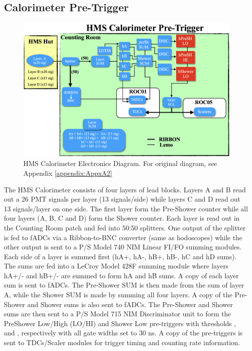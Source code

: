 \documentclass[11pt]{article}
\begin{document}
\subsection{Calorimeter Pre-Trigger}
\begin{figure}[h!]
  \centering
  \includegraphics[scale=0.35]{./hCAL_diagram.png}
  \caption{HMS Calorimeter Electronics Diagram. For original diagram, see Appendix \ref{appendix:AppxA2}}
  \label{fig:hCAL_diagram}
\end{figure}
\noindent The HMS Calorimeter consists of four layers of lead blocks. Layers A and B read out a 26 PMT signals per layer (13 signals/side) while layers C and D
read out 13 signals/layer on one side. The first layer form the Pre-Shower counter while all four layers (A, B, C and D) form the Shower counter.  
Each layer is read out in the Counting Room patch and fed into 50:50 splitters. One output of the splitter is fed to fADCs via a Ribbon-to-BNC converter (same as hodoscopes)
while the other output is sent to a P/S Model 740 NIM Linear FI/FO summing modules. Each side of a layer is summed first (hA+, hA-, hB+, hB-, hC and hD sums). The sums are fed into
a LeCroy Model 428F summing module where layers hA+/- and hB+/- are summed to form hA and hB sums. A copy of each layer sum is sent to fADCs. The Pre-Shower SUM is then made from the sum of layer A, while the Shower SUM is made by summing all four layers. A copy of the Pre-Shower and Shower sums is also sent to fADCs. The Pre-Shower and Shower sums are then sent to a P/S Model 715
NIM Discriminator unit to form the PreShower Low/High (LO/HI) and Shower Low pre-triggers with thresholds \hPrShLo, \hPrShHi and \hSHLo, respectively with all gate widths set to 30 ns. A copy of the pre-triggers is sent to TDCs/Scaler modules for trigger timing and counting rate
information.
\end{document}

